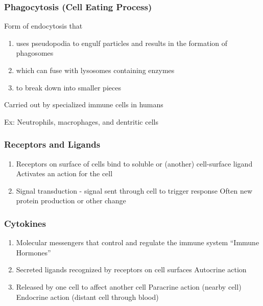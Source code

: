 \documentclass{notes}
\begin{document}
\subsubsection*{Phagocytosis (Cell Eating Process)}
Form of endocytosis that

\begin{enumerate}
    \item uses pseudopodia to engulf particles and results in the formation of phagosomes
    \item which can fuse with lysosomes containing enzymes
    \item to break down into smaller pieces
\end{enumerate}

Carried out by specialized immune cells in humans

\hspace*{10px} Ex: Neutrophils, macrophages, and dentritic cells

\subsubsection*{Receptors and Ligands}

\begin{enumerate}
    \item Receptors on surface of cells bind to soluble or (another) cell-surface ligand
          \subitem Activates an action for the cell
    \item Signal transduction - signal sent through cell to trigger response
          \subitem Often new protein production or other change
\end{enumerate}

\subsubsection*{Cytokines}

\begin{enumerate}
    \item Molecular messengers that control and regulate the immune system
          \subitem ``Immune Hormones''
    \item Secreted ligands recognized by receptors on cell surfaces
          \subitem Autocrine action
    \item Released by one cell to affect another cell
          \subitem Paracrine action (nearby cell)
          \subitem Endocrine action (distant cell through blood)
\end{enumerate}
\end{document}
